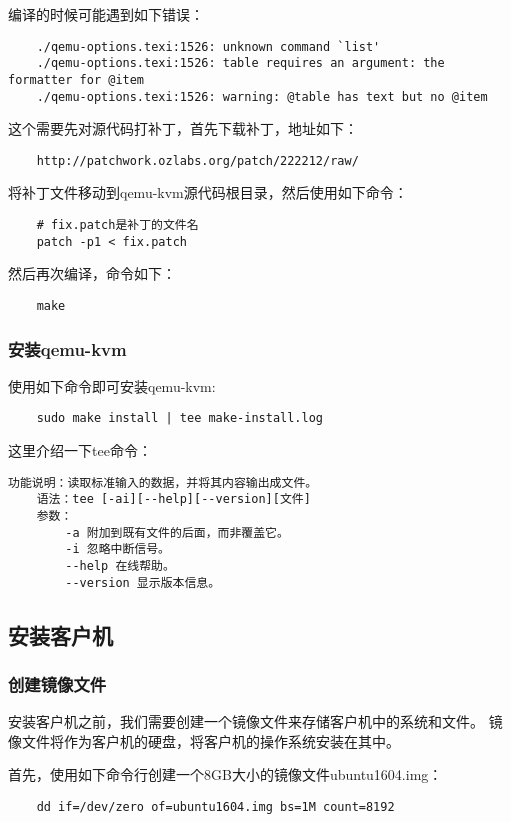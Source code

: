\documentclass[a4paper,left=2.5cm,right=2.5cm,11pt]{article}
\begin{document}
	编译的时候可能遇到如下错误：
	\begin{lstlisting}
	./qemu-options.texi:1526: unknown command `list'
  	./qemu-options.texi:1526: table requires an argument: the formatter for @item
  	./qemu-options.texi:1526: warning: @table has text but no @item
	\end{lstlisting}

	这个需要先对源代码打补丁，首先下载补丁，地址如下：
	\begin{lstlisting}
	http://patchwork.ozlabs.org/patch/222212/raw/
	\end{lstlisting}

	将补丁文件移动到qemu-kvm源代码根目录，然后使用如下命令：
	\begin{lstlisting}
	# fix.patch是补丁的文件名
	patch -p1 < fix.patch
	\end{lstlisting}

	然后再次编译，命令如下：
	\begin{lstlisting}
	make
	\end{lstlisting}

\subsubsection{安装qemu-kvm}
	使用如下命令即可安装qemu-kvm:
	\begin{lstlisting}
	sudo make install | tee make-install.log
	\end{lstlisting}

	这里介绍一下tee命令：
	\begin{lstlisting}[numberstyle = \color{white}]
	功能说明：读取标准输入的数据，并将其内容输出成文件。
	语法：tee [-ai][--help][--version][文件]
	参数：
		-a 附加到既有文件的后面，而非覆盖它。
		-i 忽略中断信号。
		--help 在线帮助。
		--version 显示版本信息。
	\end{lstlisting}

\subsection{安装客户机}
\subsubsection{创建镜像文件}
	安装客户机之前，我们需要创建一个镜像文件来存储客户机中的系统和文件。
	镜像文件将作为客户机的硬盘，将客户机的操作系统安装在其中。\par
	
	首先，使用如下命令行创建一个8GB大小的镜像文件ubuntu1604.img：
	\begin{lstlisting}
	dd if=/dev/zero of=ubuntu1604.img bs=1M count=8192
	\end{lstlisting}
\end{document}
